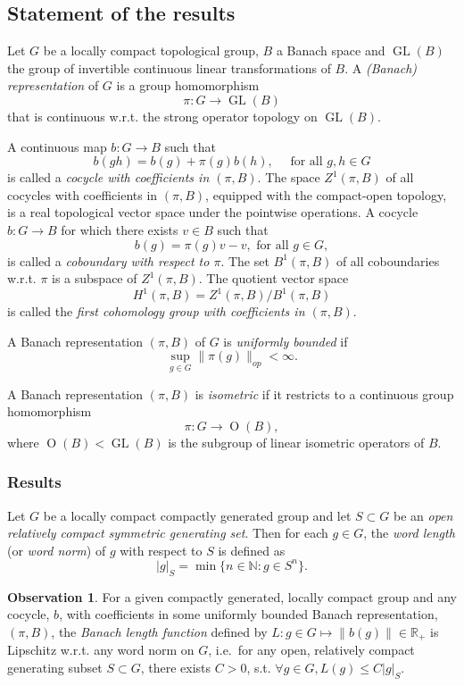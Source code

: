 \documentclass[12pt]{amsart}
\theoremstyle{definition}
\newtheorem{ob}[theorem]{Observation}
\newcommand{\BR}{{\mathbb{R}}}     %
\begin{document}
\subsection{Statement of the results}
\label{sec:statement_of_the_results}

Let \(G\) be a locally compact topological group, \(B\) a Banach space and
\(\operatorname{GL}(B)\) the group of invertible continuous linear
transformations of \(B\). A \emph{(Banach) representation} of \(G\) is a
group homomorphism \[\pi: G \to \operatorname{GL}(B)\] that is
continuous w.r.t. the strong operator topology on
\(\operatorname{GL}(B)\).

A continuous map \(b: G \rightarrow B\) such that
\[b(g h)=b(g)+\pi(g) b(h), \quad \text { for all } g, h \in G\] is
called a \emph{cocycle with coefficients in \((\pi,B)\)}.
The space \(Z^1(\pi,B)\) of all cocycles with coefficients in
\((\pi,B)\), equipped with the compact-open topology, is a real
topological vector space under the pointwise operations.
A cocycle \(b: G \rightarrow B\) for which there exists \(v \in B\) such
that \[b(g)=\pi(g) v- v, \text { for all } g \in G,\] is called a
\emph{coboundary with respect to \(\pi\)}.
The set \(B^1(\pi,B)\) of all coboundaries w.r.t. \(\pi\) is a subspace
of \(Z^1(\pi,B)\).
The quotient vector space \[H^1(\pi,B)=Z^1(\pi,B) / B^1( \pi,B)\] is
called the \emph{first cohomology group with coefficients in
\((\pi,B)\)}.

A Banach representation \((\pi,B)\) of \(G\) is \emph{uniformly
bounded} if \[\sup_{g \in G} \|\pi(g)\|_{op} < \infty.\]

A Banach representation \((\pi ,B)\) is \emph{isometric} if it restricts
to a continuous group homomorphism \[\pi: G \to \operatorname{O}(B),\]
where \(\operatorname{O}(B) < \operatorname{GL}(B)\) is the subgroup of
linear isometric operators of \(B\).



\subsubsection{Results}
\label{sec:results}

Let \(G\) be a locally compact compactly generated group and let
\(S \subset G\) be an \emph{open relatively compact symmetric generating
set}. Then for each \(g \in G\), the \emph{word length} (or \emph{word
norm}) of \(g\) with respect to \(S\) is defined as
\[|g|_S = \min \{ n \in \mathbb{N} : g \in S^{n} \}.\]


\begin{ob}
\label{466efb}
For a given compactly generated, locally compact group and any 
 cocycle, $b$, with coefficients in
some uniformly bounded Banach representation, \((\pi,B)\), the \emph{Banach length function} defined by \(L: g\in G \mapsto\|b(g)\|\in\BR_+\)
 is Lipschitz w.r.t. any word norm on \(G\),
i.e.~for any open, relatively compact generating subset \(S \subset G\),
there exists \(C > 0\), s.t. \(\forall g \in G, L(g) \leq C|g|_{S}\).
\end{ob}
\end{document}
